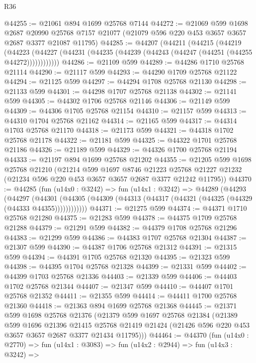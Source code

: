 \begin{lexlean}{R36}
\begin{coremodule}
@44255 := @21061 @894 @1699 @25768 @7144
@44272 := @21069
    @599
    @1698
    @2687
    @20990
    @25768
    @7157
    @21077
    (@21079 @596 @220 @453 @3657 @3657 @2687 @3377 @21087 @11795)
@44285 := @44207
    (@44211
      (@44215
        (@44219
          (@44223 (@44227 (@44231 (@44235 (@44239 (@44243 (@44247 (@44251 (@44255 @44272))))))))))))
@44286 := @21109 @599
@44289 := @44286 @1710 @25768 @21114
@44290 := @21117 @599
@44293 := @44290 @1709 @25768 @21122
@44294 := @21125 @599
@44297 := @44294 @1708 @25768 @21130
@44298 := @21133 @599
@44301 := @44298 @1707 @25768 @21138
@44302 := @21141 @599
@44305 := @44302 @1706 @25768 @21146
@44306 := @21149 @599
@44309 := @44306 @1705 @25768 @21154
@44310 := @21157 @599
@44313 := @44310 @1704 @25768 @21162
@44314 := @21165 @599
@44317 := @44314 @1703 @25768 @21170
@44318 := @21173 @599
@44321 := @44318 @1702 @25768 @21178
@44322 := @21181 @599
@44325 := @44322 @1701 @25768 @21186
@44326 := @21189 @599
@44329 := @44326 @1700 @25768 @21194
@44333 := @21197 @894 @1699 @25768 @21202
@44355 := @21205
    @599
    @1698
    @25768
    @21210
    (@21214
      @599
      @1697
      @8746
      @21223
      @25768
      @21227
      @21232
      (@21234 @596 @220 @453 @3657 @3657 @2687 @3377 @21242 @11795))
@44370 := @44285
    (fun (u14x0 : @3242) =>
    fun (u14x1 : @3242) =>
    @44289
      (@44293
        (@44297
          (@44301 (@44305 (@44309 (@44313 (@44317 (@44321 (@44325 (@44329 (@44333 @44355))))))))))))
@44371 := @21275 @599
@44374 := @44371 @1710 @25768 @21280
@44375 := @21283 @599
@44378 := @44375 @1709 @25768 @21288
@44379 := @21291 @599
@44382 := @44379 @1708 @25768 @21296
@44383 := @21299 @599
@44386 := @44383 @1707 @25768 @21304
@44387 := @21307 @599
@44390 := @44387 @1706 @25768 @21312
@44391 := @21315 @599
@44394 := @44391 @1705 @25768 @21320
@44395 := @21323 @599
@44398 := @44395 @1704 @25768 @21328
@44399 := @21331 @599
@44402 := @44399 @1703 @25768 @21336
@44403 := @21339 @599
@44406 := @44403 @1702 @25768 @21344
@44407 := @21347 @599
@44410 := @44407 @1701 @25768 @21352
@44411 := @21355 @599
@44414 := @44411 @1700 @25768 @21360
@44418 := @21363 @894 @1699 @25768 @21368
@44445 := @21371
    @599
    @1698
    @25768
    @21376
    (@21379
      @599
      @1697
      @25768
      @21384
      (@21389
        @599
        @1696
        @21396
        @21415
        @25768
        @21419
        @21424
        (@21426 @596 @220 @453 @3657 @3657 @2687 @3377 @21434 @11795)))
@44464 := @44370
    (fun (u14x0 : @2770) =>
    fun (u14x1 : @3083) =>
    fun (u14x2 : @2944) =>
    fun (u14x3 : @3242) =>

\end{coremodule}
\end{lexlean}
